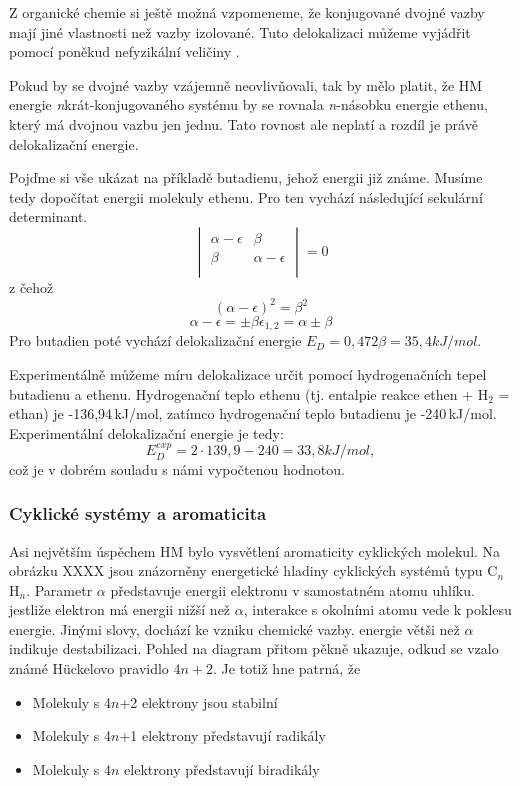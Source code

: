 Z organické chemie si ještě možná vzpomeneme, že konjugované dvojné vazby mají jiné vlastnosti než vazby izolované.
Tuto delokalizaci můžeme vyjádřit pomocí poněkud nefyzikální veličiny .

Pokud by se dvojné vazby vzájemně neovlivňovali, tak by mělo platit, že HM energie
\textit{n}krát-konjugovaného systému by se rovnala \textit{n}-násobku energie ethenu, který má dvojnou vazbu jen jednu. Tato rovnost ale neplatí a rozdíl je právě delokalizační energie. 

Pojďme si vše ukázat na příkladě butadienu, jehož energii již známe. Musíme tedy dopočítat energii molekuly ethenu. Pro ten vychází následující sekulární determinant. 
\begin{equation}
\begin{vmatrix}
\alpha - \epsilon & \beta \\
\beta & \alpha - \epsilon \\
\end{vmatrix}
=0
\end{equation}
z čehož
$$
(\alpha-\epsilon)^2=\beta^2
$$
$$
\alpha - \epsilon = \pm \beta
\epsilon_{1,2}= \alpha\pm \beta
$$
Pro butadien poté vychází delokalizační energie $E_D=0,472\beta=35,4 kJ/mol$.


Experimentálně můžeme míru delokalizace určit pomocí hydrogenačních tepel butadienu a ethenu.
Hydrogenační teplo ethenu (tj. entalpie reakce ethen + H$_2$ = ethan) je -136,94\,kJ/mol, zatímco hydrogenační teplo butadienu je -240\,kJ/mol. Experimentální delokalizační energie je tedy:
$$
E_D^{exp}=2\cdot139,9-240 = 33,8 kJ/mol,
$$
což je v dobrém souladu s námi vypočtenou hodnotou.

\subsubsection{Cyklické systémy a aromaticita}

Asi největším úspěchem HM bylo vysvětlení aromaticity cyklických molekul. Na obrázku XXXX jsou znázorněny energetické hladiny cyklických systémů typu C$_n$H$_n$. Parametr $\alpha$ představuje energii elektronu v samostatném atomu uhlíku. jestliže elektron má energii nižší než  $\alpha$, interakce s okolními atomu vede k poklesu energie. Jinými slovy, dochází ke vzniku chemické vazby. energie větši než $\alpha$ indikuje destabilizaci. Pohled na diagram přitom pěkně ukazuje, odkud se vzalo známé  H\"{u}ckelovo pravidlo $4n+2$. Je totiž hne patrná, že

\begin{itemize}
\item Molekuly s 4$n$+2 elektrony jsou stabilní
\item Molekuly s 4$n$+1 elektrony představují radikály
\item Molekuly s 4$n$ elektrony představují biradikály
\end{itemize}


